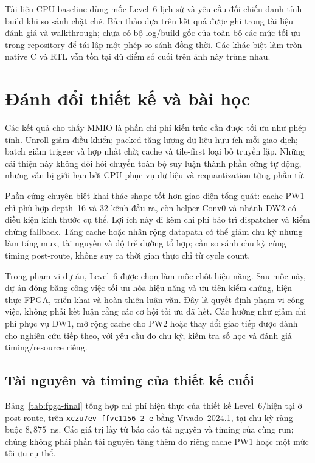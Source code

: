Tài liệu CPU baseline dùng mốc Level~6 lịch sử và yêu cầu đối chiếu danh tính build khi so sánh chặt chẽ. Bản thảo dựa trên kết quả được ghi trong tài liệu đánh giá và walkthrough; chưa có bộ log/build gốc của toàn bộ các mức tối ưu trong repository để tái lập một phép so sánh đồng thời. Các khác biệt làm tròn native C và RTL vẫn tồn tại dù điểm số cuối trên ảnh này trùng nhau.

\section{Đánh đổi thiết kế và bài học}
Các kết quả cho thấy MMIO là phần chi phí kiến trúc cần được tối ưu như phép tính. Unroll giảm điều khiển; packed tăng lượng dữ liệu hữu ích mỗi giao dịch; batch giảm trigger và hợp nhất chờ; cache và tile-first loại bỏ truyền lặp. Những cải thiện này không đòi hỏi chuyển toàn bộ suy luận thành phần cứng tự động, nhưng vẫn bị giới hạn bởi CPU phục vụ dữ liệu và requantization từng phần tử.

Phần cứng chuyên biệt khai thác shape tốt hơn giao diện tổng quát: cache PW1 chỉ phù hợp depth~16 và 32 kênh đầu ra, còn helper Conv0 và nhánh DW2 có điều kiện kích thước cụ thể. Lợi ích này đi kèm chi phí bảo trì dispatcher và kiểm chứng fallback. Tăng cache hoặc nhân rộng datapath có thể giảm chu kỳ nhưng làm tăng mux, tài nguyên và độ trễ đường tổ hợp; cần so sánh chu kỳ cùng timing post-route, không suy ra thời gian thực chỉ từ cycle count.

Trong phạm vi dự án, Level~6 được chọn làm mốc chốt hiệu năng. Sau mốc này, dự án đóng băng công việc tối ưu hóa hiệu năng và ưu tiên kiểm chứng, hiện thực FPGA, triển khai và hoàn thiện luận văn. Đây là quyết định phạm vi công việc, không phải kết luận rằng các cơ hội tối ưu đã hết. Các hướng như giảm chi phí phục vụ DW1, mở rộng cache cho PW2 hoặc thay đổi giao tiếp được dành cho nghiên cứu tiếp theo, với yêu cầu đo chu kỳ, kiểm tra số học và đánh giá timing/resource riêng.

\newpage
\subsection{Tài nguyên và timing của thiết kế cuối}
Bảng~\ref{tab:fpga-final} tổng hợp chi phí hiện thực của thiết kế Level~6/hiện tại ở post-route, trên \texttt{xczu7ev-ffvc1156-2-e} bằng Vivado~2024.1, tại chu kỳ ràng buộc $8{,}875$~ns. Các giá trị lấy từ báo cáo tài nguyên và timing của cùng run; chúng không phải phần tài nguyên tăng thêm do riêng cache PW1 hoặc một mức tối ưu cụ thể.

